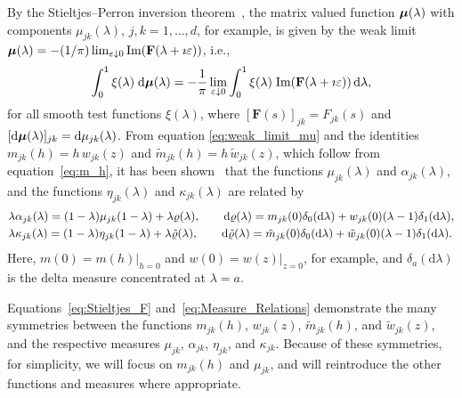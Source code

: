 \documentclass{cmslatex}
\renewcommand{\d}{\text{d}}
\newcommand\bmu{\mbox{\boldmath${\mu}$}}
\begin{document}
By the Stieltjes--Perron inversion
theorem~\cite{Henrici:1974:v2,MILTON:2002:TC}, the matrix valued
function 
$\bmu(\lambda)$ with components $\mu_{jk}(\lambda)$, $j,k=1,\ldots,d$, for example, is
given by the weak limit  
$\bmu(\lambda)=-(1/\pi)\lim_{\varepsilon\downarrow0}\text{Im}(\mathbf{F}(\lambda+\imath\varepsilon))$, i.e., 
%
\begin{align}\label{eq:weak_limit_mu}
  \int_0^1\xi(\lambda)\;\d\bmu(\lambda)
  =-\frac{1}{\pi}\lim_{\varepsilon\downarrow0}
        \int_0^1\xi(\lambda)\;\text{Im}(\mathbf{F}(\lambda+\imath\varepsilon))\, \d\lambda,
\end{align}
%
for all smooth test functions $\xi(\lambda)$, where
$[\mathbf{F}(s)]_{jk}=F_{jk}(s)$ and
$[\d\bmu(\lambda)]_{jk}=\d\mu_{jk}(\lambda)$. From equation 
\eqref{eq:weak_limit_mu} and the identities 
$m_{jk}(h)=h\,w_{jk}(z)$ and $\tilde{m}_{jk}(h)=h\,\tilde{w}_{jk}(z)$,
which follow from equation~\eqref{eq:m_h}, it has been
shown~\cite{Murphy:JMP:063506} that the functions $\mu_{jk}(\lambda)$ and
$\alpha_{jk}(\lambda)$, and the functions $\eta_{jk}(\lambda)$ and $\kappa_{jk}(\lambda)$ are
related by
%
\begin{align}\label{eq:Measure_Relations}
  &\lambda\alpha_{jk}(\lambda)=(1-\lambda)\mu_{jk}(1-\lambda)+\lambda\varrho(\lambda), \qquad
  \d\varrho(\lambda)=m_{jk}(0)\delta_0(\d\lambda)+w_{jk}(0)(\lambda-1)\delta_1(\d\lambda),
  \notag     \\
  &\lambda\kappa_{jk}(\lambda)=(1-\lambda)\eta_{jk}(1-\lambda)+\lambda\tilde{\varrho}(\lambda), \qquad
  \d\tilde{\varrho}(\lambda)=\tilde{m}_{jk}(0)\delta_0(\d\lambda)+\tilde{w}_{jk}(0)(\lambda-1)\delta_1(\d\lambda).  
\end{align}
%
Here, $m(0)=m(h)|_{h=0}$ and $w(0)=w(z)|_{z=0}$, for example, and
$\delta_a(\d\lambda)$ is the delta measure concentrated at $\lambda=a$.



Equations~\eqref{eq:Stieltjes_F} and~\eqref{eq:Measure_Relations}
demonstrate the many symmetries between 
the functions $m_{jk}(h)$, $w_{jk}(z)$, $\tilde{m}_{jk}(h)$, and
$\tilde{w}_{jk}(z)$, and the respective measures $\mu_{jk}$, $\alpha_{jk}$,
$\eta_{jk}$, and $\kappa_{jk}$. Because of these symmetries, for simplicity,
we will focus on $m_{jk}(h)$ and $\mu_{jk}$, and will reintroduce the
other functions and measures where appropriate.  
\end{document}

